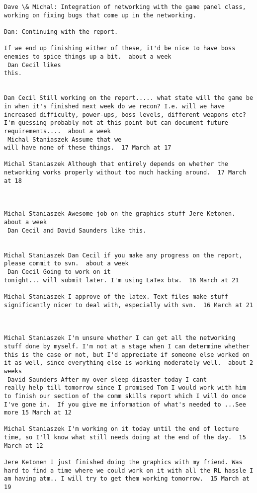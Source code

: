 \documentclass[10pt]{report}
\begin{document}
\begin{verbatim}
Dave \& Michal: Integration of networking with the game panel class,
working on fixing bugs that come up in the networking.

Dan: Continuing with the report.

If we end up finishing either of these, it'd be nice to have boss
enemies to spice things up a bit.  about a week 
 Dan Cecil likes
this.


Dan Cecil Still working on the report..... what state will the game be
in when it's finished next week do we recon? I.e. will we have
increased difficulty, power-ups, boss levels, different weapons etc?
I'm guessing probably not at this point but can document future
requirements....  about a week 
 Michal Staniaszek Assume that we
will have none of these things.  17 March at 17

Michal Staniaszek Although that entirely depends on whether the
networking works properly without too much hacking around.  17 March
at 18



Michal Staniaszek Awesome job on the graphics stuff Jere Ketonen.
about a week 
 Dan Cecil and David Saunders like this.


Michal Staniaszek Dan Cecil if you make any progress on the report,
please commit to svn.  about a week 
 Dan Cecil Going to work on it
tonight... will submit later. I'm using LaTex btw.  16 March at 21

Michal Staniaszek I approve of the latex. Text files make stuff
significantly nicer to deal with, especially with svn.  16 March at 21



Michal Staniaszek I'm unsure whether I can get all the networking
stuff done by myself. I'm not at a stage when I can determine whether
this is the case or not, but I'd appreciate if someone else worked on
it as well, since everything else is working moderately well.  about 2
weeks 
 David Saunders After my over sleep disaster today I cant
really help till tomorrow since I promised Tom I would work with him
to finish our section of the comm skills report which I will do once
I've gone in.  If you give me information of what's needed to ...See
more 15 March at 12

Michal Staniaszek I'm working on it today until the end of lecture
time, so I'll know what still needs doing at the end of the day.  15
March at 12

Jere Ketonen I just finished doing the graphics with my friend. Was
hard to find a time where we could work on it with all the RL hassle I
am having atm.. I will try to get them working tomorrow.  15 March at
19




\end{verbatim}
\end{document}
